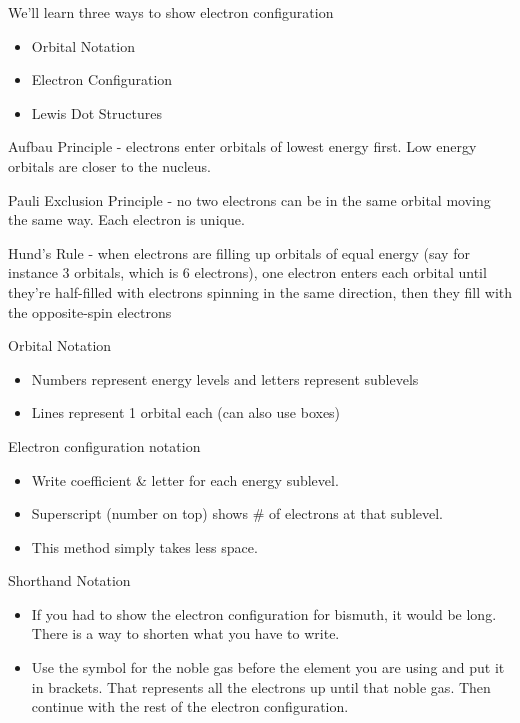 \documentclass[../hchem.tex]{subfiles}
\begin{document}
We'll learn three ways to show electron configuration 
\begin{itemize}
    \item Orbital Notation 
    \item Electron Configuration 
    \item Lewis Dot Structures
\end{itemize}

Aufbau Principle - electrons enter orbitals of lowest energy first. Low energy orbitals are closer to the nucleus.

Pauli Exclusion Principle - no two electrons can be in the same orbital moving the same way. Each electron is unique.

Hund's Rule - when electrons are filling up orbitals of equal energy (say for instance 3 orbitals, which is 6 electrons), one electron enters 
each orbital until they're half-filled with electrons spinning in the same direction, then they fill with the opposite-spin electrons 

Orbital Notation
\begin{itemize}
    \item Numbers represent energy levels and letters represent sublevels 
    \item Lines represent 1 orbital each (can also use boxes)
\end{itemize}

Electron configuration notation 
\begin{itemize}
    \item Write coefficient \& letter for each energy sublevel.
    \item Superscript (number on top) shows \# of electrons at that sublevel.
    \item This method simply takes less space.
\end{itemize}

Shorthand Notation
\begin{itemize}
    \item If you had to show the electron configuration for bismuth, it would be long. There is a way to shorten what you have to write.
    \item Use the symbol for the noble gas before the element you are using and put it in brackets. That represents all the electrons up until that noble gas. Then continue with the rest of the electron configuration.
\end{itemize}
\end{document}
